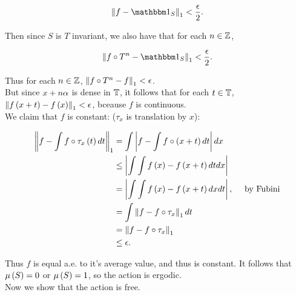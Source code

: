 \documentclass[a4paper,10pt]{report}
\begin{document}
\begin{enumerate}
                \begin{align*}
                  \NK f - \mb 1_S \KN_1 < \fa{\ep}{2}.
                \end{align*}

                Then since $S$ is $T$ invariant, we also have that for each $n \in \mathbb Z$,

                \begin{align*}
                  \NK f \circ T^n - \mb 1_S \KN_1 < \fa{\ep}{2}.
                \end{align*}

                Thus for each $n \in \mathbb Z$, $\left\| f \circ T^n - f \right\|_1 < \epsilon$.\\
                But since $x + n \alpha$ is dense in $\mathbb T$, it follows that for each $t \in \mathbb T$, $\left\| f \left( x + t \right) - f \left( x \right) \right\|_1 < \epsilon$, bceause $f$ is continuous.\\
                We claim that $f$ is constant: ($\tau_x$ is translation by $x$):

                \begin{align*}
                  \NK f - \I f \circ \tau_x \E t \R dt \KN_1%
                  &= \I \MG f - \I f \circ \E x + t \R dt \GM dx\\
                  &\leq \MG \I \I f \E x \R - f \E x + t \R dt dx \GM\\
                  &= \MG \I \I f \E x \R - f \E x + t \R dx dt \GM , \quad \te{ by Fubini}\\
                  &= \I \NK f - f \circ \tau_x \KN_1 dt\\
                  &= \NK f - f \circ \tau_x \KN_1\\
                  &\leq \ep.
                \end{align*}

                Thus $f$ is equal a.e. to it's average value, and thus is constant.  It follows that $\mu \left( S \right) = 0$ or $\mu \left( S \right) = 1$, so the action is ergodic.\\


                Now we show that the action is free.\\


\end{enumerate}
\end{document}
